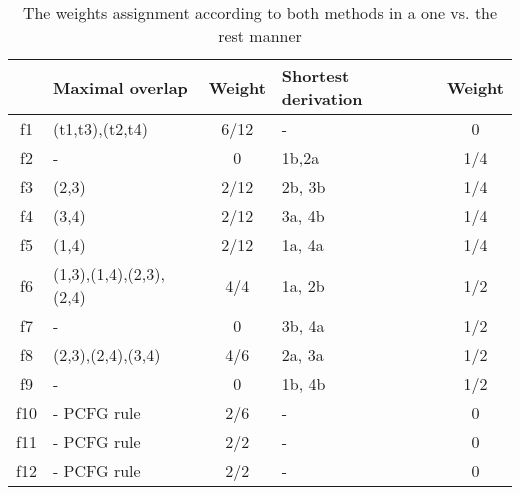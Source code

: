 \begin{table}[h!]
\center
\begin{tabular}{c|p{}c|p{}c|}
&Maximal overlap&Weight&Shortest derivation\footnotemark&Weight\\\hline
f1&(t1,t3),(t2,t4)&6/12&-&0\\
f2&-&0&1b,2a&1/4\\
f3&(2,3)&2/12&2b, 3b&1/4\\
f4&(3,4)&2/12&3a, 4b&1/4\\
f5&(1,4)&2/12&1a, 4a&1/4\\
f6&(1,3),(1,4),(2,3),(2,4)&4/4&1a, 2b&1/2\\
f7&-&0&3b, 4a&1/2\\
f8&(2,3),(2,4),(3,4)&4/6&2a, 3a&1/2\\
f9&-&0&1b, 4b&1/2\\
f10&-  PCFG rule&2/6&-&0\\
f11&- PCFG rule&2/2&-&0\\
f12&- PCFG rule&2/2&-&0\\
\end{tabular}
\caption{The weights assignment according to both methods in a one vs. the rest manner}
\label{t:weights}
\end{table}




























